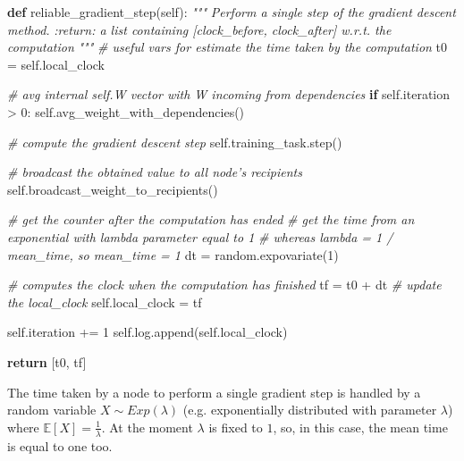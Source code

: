 \documentclass[11pt]{article}
\newenvironment{Shaded}{}{}
\newcommand{\KeywordTok}[1]{\textcolor[rgb]{0.00,0.44,0.13}{\textbf{{#1}}}}
\newcommand{\DecValTok}[1]{\textcolor[rgb]{0.25,0.63,0.44}{{#1}}}
\newcommand{\CommentTok}[1]{\textcolor[rgb]{0.38,0.63,0.69}{\textit{{#1}}}}
\newcommand{\NormalTok}[1]{{#1}}
\newcommand{\VariableTok}[1]{\textcolor[rgb]{0.10,0.09,0.49}{{#1}}}
\newcommand{\ControlFlowTok}[1]{\textcolor[rgb]{0.00,0.44,0.13}{\textbf{{#1}}}}
\newcommand{\OperatorTok}[1]{\textcolor[rgb]{0.40,0.40,0.40}{{#1}}}
\begin{document}
\begin{Shaded}
\begin{Highlighting}[]
\KeywordTok{def}\NormalTok{ reliable_gradient_step(}\VariableTok{self}\NormalTok{):}
    \CommentTok{"""}
\CommentTok{    Perform a single step of the gradient descent method.}
\CommentTok{    :return: a list containing [clock_before, clock_after] w.r.t. the computation}
\CommentTok{    """}
    \CommentTok{# useful vars for estimate the time taken by the computation}
\NormalTok{    t0 }\OperatorTok{=} \VariableTok{self}\NormalTok{.local_clock}

    \CommentTok{# avg internal self.W vector with W incoming from dependencies}
    \ControlFlowTok{if} \VariableTok{self}\NormalTok{.iteration }\OperatorTok{>} \DecValTok{0}\NormalTok{:}
        \VariableTok{self}\NormalTok{.avg_weight_with_dependencies()}

    \CommentTok{# compute the gradient descent step}
    \VariableTok{self}\NormalTok{.training_task.step()}

    \CommentTok{# broadcast the obtained value to all node's recipients}
    \VariableTok{self}\NormalTok{.broadcast_weight_to_recipients()}

    \CommentTok{# get the counter after the computation has ended}
    \CommentTok{# get the time from an exponential with lambda parameter equal to 1}
    \CommentTok{# whereas lambda = 1 / mean_time, so mean_time = 1}
\NormalTok{    dt }\OperatorTok{=}\NormalTok{ random.expovariate(}\DecValTok{1}\NormalTok{)}

    \CommentTok{# computes the clock when the computation has finished}
\NormalTok{    tf }\OperatorTok{=}\NormalTok{ t0 }\OperatorTok{+}\NormalTok{ dt}
    \CommentTok{# update the local_clock}
    \VariableTok{self}\NormalTok{.local_clock }\OperatorTok{=}\NormalTok{ tf}

    \VariableTok{self}\NormalTok{.iteration }\OperatorTok{+=} \DecValTok{1}
    \VariableTok{self}\NormalTok{.log.append(}\VariableTok{self}\NormalTok{.local_clock)}

    \ControlFlowTok{return}\NormalTok{ [t0, tf]}
\end{Highlighting}
\end{Shaded}

The time taken by a node to perform a single gradient step is handled by
a random variable \(X \sim Exp(\lambda)\) (e.g. exponentially
distributed with parameter \(\lambda\)) where
\(\mathbb{E}[X] = \frac{1}{\lambda}\). At the moment \(\lambda\) is
fixed to \(1\), so, in this case, the mean time is equal to one too.
\end{document}
